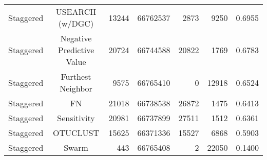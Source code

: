 \documentclass[]{article}
\begin{document}
\begin{table}[!ht]
\begin{tabular}{lcrrrrc}
  Staggered & USEARCH (w/DGC) & 13244 & 66762537 & 2873 & 9250 & 0.6955 \\ 
  Staggered & Negative Predictive Value & 20724 & 66744588 & 20822 & 1769 & 0.6783 \\ 
  Staggered & Furthest Neighbor & 9575 & 66765410 & 0 & 12918 & 0.6524 \\ 
  Staggered & FN & 21018 & 66738538 & 26872 & 1475 & 0.6413 \\ 
  Staggered & Sensitivity & 20981 & 66737899 & 27511 & 1512 & 0.6361 \\ 
  Staggered & OTUCLUST & 15625 & 66371336 & 15527 & 6868 & 0.5903 \\ 
  Staggered & Swarm & 443 & 66765408 & 2 & 22050 & 0.1400 \\ 
   \hline
\end{tabular}
\endgroup
\label{}
\end{table}
\end{document}
